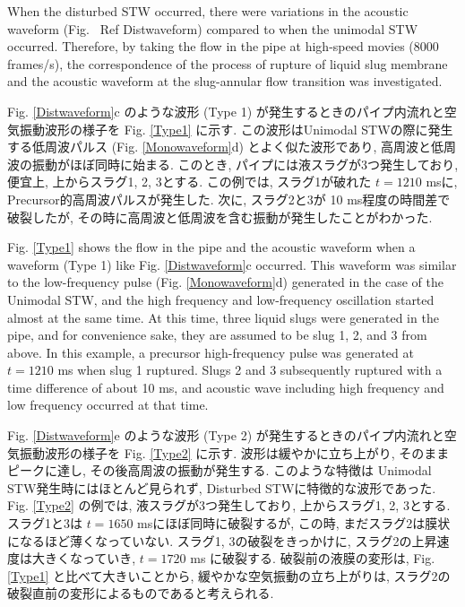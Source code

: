 \documentclass[12pt]{article}
\begin{document}
When the disturbed STW occurred, there were variations in the acoustic waveform (Fig. \ Ref {Distwaveform}) compared to when the unimodal STW occurred.
Therefore, by taking the flow in the pipe at high-speed movies (8000 frames/s), the correspondence of the process of rupture of liquid slug membrane and the acoustic waveform at the slug-annular flow transition was investigated.

Fig. \ref{Distwaveform}c のような波形 (Type 1) が発生するときのパイプ内流れと空気振動波形の様子を Fig. \ref{Type1} に示す. 
この波形はUnimodal STWの際に発生する低周波パルス (Fig. \ref{Monowaveform}d) とよく似た波形であり, 高周波と低周波の振動がほぼ同時に始まる. 
このとき, パイプには液スラグが3つ発生しており, 便宜上, 上からスラグ1, 2, 3とする. 
この例では, スラグ1が破れた $t=1210$ msに, Precursor的高周波パルスが発生した. 
次に, スラグ2と3が 10 ms程度の時間差で破裂したが, その時に高周波と低周波を含む振動が発生したことがわかった.

Fig. \ref{Type1} shows the flow in the pipe and the acoustic waveform when a waveform (Type 1) like Fig. \ref {Distwaveform}c occurred.
This waveform was similar to the low-frequency pulse (Fig. \ref {Monowaveform}d) generated in the case of the Unimodal STW, and the high frequency and low-frequency oscillation started almost at the same time.
At this time, three liquid slugs were generated in the pipe, and for convenience sake, they are assumed to be slug 1, 2, and 3 from above.
In this example, a precursor high-frequency pulse was generated at $t = 1210$ ms when slug 1 ruptured.
Slugs 2 and 3 subsequently ruptured with a time difference of about 10 ms, and acoustic wave including high frequency and low frequency occurred at that time.

Fig. \ref{Distwaveform}e のような波形 (Type 2) が発生するときのパイプ内流れと空気振動波形の様子を Fig. \ref{Type2} に示す. 
波形は緩やかに立ち上がり, そのままピークに達し, その後高周波の振動が発生する. 
このような特徴は Unimodal STW発生時にはほとんど見られず, Disturbed STWに特徴的な波形であった. 
Fig. \ref{Type2} の例では, 液スラグが3つ発生しており, 上からスラグ1, 2, 3とする. スラグ1と3は $t=1650$ msにほぼ同時に破裂するが, この時, まだスラグ2は膜状になるほど薄くなっていない. スラグ1, 3の破裂をきっかけに, スラグ2の上昇速度は大きくなっていき, $t=1720$ ms に破裂する. 破裂前の液膜の変形は, Fig. \ref{Type1} と比べて大きいことから, 緩やかな空気振動の立ち上がりは, スラグ2の破裂直前の変形によるものであると考えられる.
\end{document}
